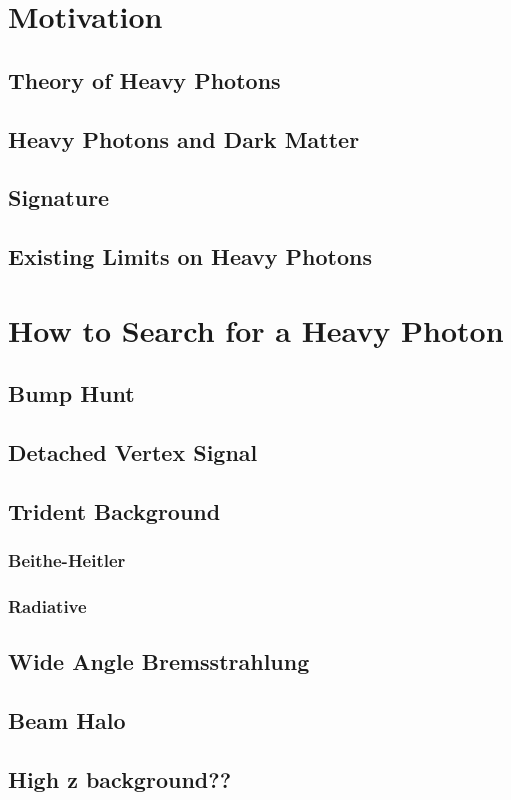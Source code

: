\documentclass[12pt]{report}
\begin{document}
\chapter{Motivation} 
\section{Theory of Heavy Photons}
\section{Heavy Photons and Dark Matter}
\section{Signature}
\section{Existing Limits on Heavy Photons}
\chapter{How to Search for a Heavy Photon}
\section{Bump Hunt}
\section{Detached Vertex Signal}
\section{Trident Background}
\subsection{Beithe-Heitler}
\subsection{Radiative}
\section{Wide Angle Bremsstrahlung}
\section{Beam Halo}
\section{High z background??}
\end{document}
